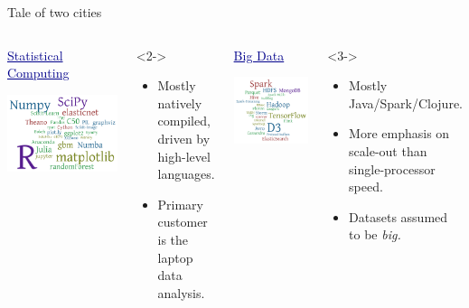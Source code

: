 \documentclass[aspectratio=169]{beamer}
\begin{document}
\begin{frame}{Tale of two cities}
\vspace{0.2 cm}
\begin{columns}
\begin{center}
\textcolor{darkblue}{\Large \underline{Statistical Computing}}

\vspace{0.25 cm}
\includegraphics[height=3.5 cm]{statistical-software.png}
\end{center}

\vspace{-0.35 cm}
\begin{uncoverenv}<2->
\begin{itemize}
\item Mostly natively compiled, driven by high-level languages.
\item Primary customer is the laptop data analysis.
\end{itemize}
\end{uncoverenv}

\begin{center}
\textcolor{darkblue}{\Large \underline{Big Data}}

\vspace{0.25 cm}
\includegraphics[height=3.5 cm]{bigdata-software.png}
\end{center}

\vspace{-0.35 cm}
\begin{uncoverenv}<3->
\begin{itemize}
\item Mostly Java/Spark/Clojure.
\item More emphasis on scale-out than single-processor speed.
\item Datasets assumed to be {\it big.}
\end{itemize}
\end{uncoverenv}

\end{columns}
\end{frame}
\end{document}
